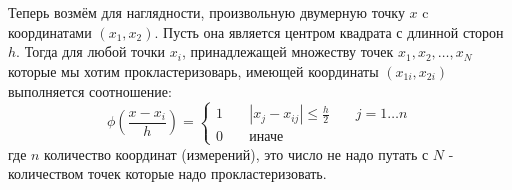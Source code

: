 \documentclass[11pt]{article}
\begin{document}
    \begin{center}
    \end{center}
    { \hspace*{\fill} \\}
    
    \\ Теперь возмём для наглядности, произвольную двумерную
точку $x$ c координатами $(x_1, x_2)$. Пусть она является центром
квадрата с длинной сторон $h$. Тогда для любой точки $x_i$,
принадлежащей множеству точек $x_1, x_2, \ldots , x_N$ которые мы хотим
прокластеризоварь, имеющей координаты $(x_{1i}, x_{2i})$ выполняется
соотношение: \[
\phi\left(\frac{x - x_i}{h}\right) = \left\lbrace
            \begin{aligned}
            1 && \; |x_j - x_{ij}| \le \frac{h}{2} && \; j = 1\ldots n \\
            0 && \; \mbox{иначе} &&
           \end{aligned}
          \right.
\] где $n$ количество координат (измерений), это число не надо путать с
$N$ - количеством точек которые надо прокластеризовать.
\end{document}

